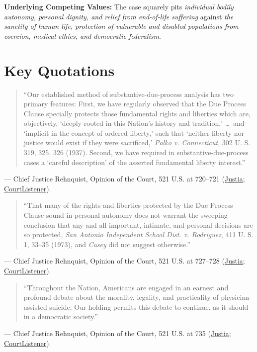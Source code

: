 \documentclass[12pt]{article}
\begin{document}
\textbf{Underlying Competing Values:} The case squarely pits \textit{individual bodily autonomy, personal dignity, and relief from end-of-life suffering} against \textit{the sanctity of human life, protection of vulnerable and disabled populations from coercion, medical ethics, and democratic federalism}.

\section{Key Quotations}

\begin{quote}
``Our established method of substantive-due-process analysis has two primary features: First, we have regularly observed that the Due Process Clause specially protects those fundamental rights and liberties which are, objectively, `deeply rooted in this Nation's history and tradition,' \ldots\ and `implicit in the concept of ordered liberty,' such that `neither liberty nor justice would exist if they were sacrificed,' \textit{Palko v. Connecticut}, 302 U. S. 319, 325, 326 (1937). Second, we have required in substantive-due-process cases a `careful description' of the asserted fundamental liberty interest.''
\end{quote}
\noindent--- Chief Justice Rehnquist, Opinion of the Court, 521 U.S. at 720--721 (\href{https://supreme.justia.com/cases/federal/us/521/702/}{Justia}; \href{https://www.courtlistener.com/opinion/118144/washington-v-glucksberg/}{CourtListener}).

\begin{quote}
``That many of the rights and liberties protected by the Due Process Clause sound in personal autonomy does not warrant the sweeping conclusion that any and all important, intimate, and personal decisions are so protected, \textit{San Antonio Independent School Dist. v. Rodriguez}, 411 U. S. 1, 33--35 (1973), and \textit{Casey} did not suggest otherwise.''
\end{quote}
\noindent--- Chief Justice Rehnquist, Opinion of the Court, 521 U.S. at 727--728 (\href{https://supreme.justia.com/cases/federal/us/521/702/}{Justia}; \href{https://www.courtlistener.com/opinion/118144/washington-v-glucksberg/}{CourtListener}).

\begin{quote}
``Throughout the Nation, Americans are engaged in an earnest and profound debate about the morality, legality, and practicality of physician-assisted suicide. Our holding permits this debate to continue, as it should in a democratic society.''
\end{quote}
\noindent--- Chief Justice Rehnquist, Opinion of the Court, 521 U.S. at 735 (\href{https://supreme.justia.com/cases/federal/us/521/702/}{Justia}; \href{https://www.courtlistener.com/opinion/118144/washington-v-glucksberg/}{CourtListener}).
\end{document}
